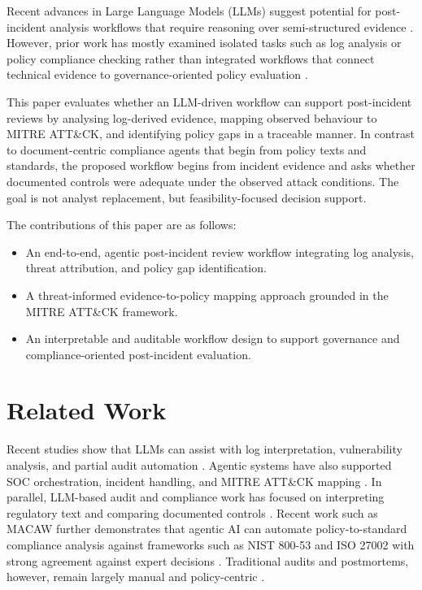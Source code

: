 \documentclass[conference]{IEEEtran}
\begin{document}
Recent advances in Large Language Models (LLMs) suggest potential for post-incident analysis workflows that require reasoning over semi-structured evidence \cite{Huang2023ReasoningSurvey, Wei2022CoT}. However, prior work has mostly examined isolated tasks such as log analysis or policy compliance checking rather than integrated workflows that connect technical evidence to governance-oriented policy evaluation \cite{Zhang2025Survey, Cadet2024Compliance}. 

This paper evaluates whether an LLM-driven workflow can support post-incident reviews by analysing log-derived evidence, mapping observed behaviour to MITRE ATT\&CK, and identifying policy gaps in a traceable manner. In contrast to document-centric compliance agents that begin from policy texts and standards, the proposed workflow begins from incident evidence and asks whether documented controls were adequate under the observed attack conditions. The goal is not analyst replacement, but feasibility-focused decision support.

The contributions of this paper are as follows:
\begin{itemize}
    \item An end-to-end, agentic post-incident review workflow integrating log analysis, threat attribution, and policy gap identification.
    \item A threat-informed evidence-to-policy mapping approach grounded in the MITRE ATT\&CK framework.
    \item An interpretable and auditable workflow design to support governance and compliance-oriented post-incident evaluation.
\end{itemize}


\section{Related Work}

Recent studies show that LLMs can assist with log interpretation, vulnerability analysis, and partial audit automation \cite{Chin2025Audit, Ruan2023Agents, Fang2024Hack}. Agentic systems have also supported SOC orchestration, incident handling, and MITRE ATT\&CK mapping \cite{Jin2024Crimson, Licitra2024SOCAI}. In parallel, LLM-based audit and compliance work has focused on interpreting regulatory text and comparing documented controls \cite{Cadet2024Compliance, Salman2024Compliance}. Recent work such as MACAW further demonstrates that agentic AI can automate policy-to-standard compliance analysis against frameworks such as NIST 800-53 and ISO 27002 with strong agreement against expert decisions \cite{Negi2026MACAW}. Traditional audits and postmortems, however, remain largely manual and policy-centric \cite{Antunes2022Audit, AtlassianPostmortem}. 
\end{document}
